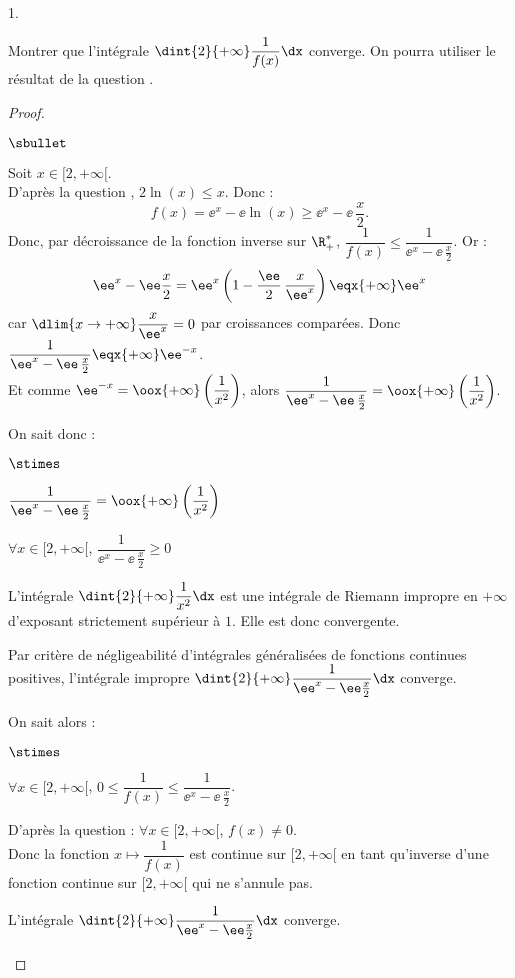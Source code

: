 \begin{noliste}{1.}
\newpage

\item Montrer que l'intégrale $\dint{2}{+\infty} \dfrac{1}{f(x)}\dx$
  converge.  On pourra utiliser le résultat de la question
  .

\begin{proof}~
\begin{noliste}{$\sbullet$}
\item Soit $x\in[2,+\infty[$.\\
D'après la question , $2\ln(x)\leq x$. Donc :
\[
f(x)=\ee^x - \ee \ln(x)\geq \ee^x - \ee \, \frac{x}{2}.
\]
Donc, par décroissance de la fonction inverse sur $\R_+^*$, 
$\dfrac{1}{f(x)}\leq \dfrac{1}{\ee^x-\ee \, \frac{x}{2}}$.
Or :
\[
\ee^x - \ee\frac{x}{2} = \ee^x \left(1 - 
\frac{\ee}{2} \, \frac{x}{\ee^x}\right) \eqx{+\infty} \ee^x
\]
car $\dlim{x\to +\infty} \dfrac{x}{\ee^x}=0$ par croissances comparées. 
Donc
$\dfrac{1}{\ee^x-\ee \, \frac{x}{2}} \eqx{+\infty} \ee^{-x}$.\\[.2cm]
Et comme 
$\ee^{-x}= \oox{+\infty}\left(\dfrac{1}{x^2}\right)$, alors
$\dfrac{1}{\ee^x-\ee \, \frac{x}{2}} = \oox{+\infty} 
\left(\dfrac{1}{x^2}\right)$.

\item On sait donc :
\begin{noliste}{$\stimes$}
  \item $\dfrac{1}{\ee^x-\ee \, \frac{x}{2}} = \oox{+\infty} 
  \left(\dfrac{1}{x^2}\right)$
  
  \item $\forall x\in [2,+\infty[$, $\dfrac{1}{\ee^x-\ee \, \frac{x}{2}}
  \geq 0$
  
  \item L'intégrale $\dint{2}{+\infty} \dfrac{1}{x^2}\dx$ est une 
  intégrale de Riemann impropre en $+\infty$ d'exposant strictement 
  supérieur à $1$. Elle est donc convergente.
\end{noliste}
Par critère de négligeabilité d'intégrales généralisées de fonctions
continues positives, l'intégrale impropre $\dint{2}{+\infty}
\dfrac{1}{\ee^x-\ee \frac{x}{2}} \dx$ converge.

\item On sait alors :
\begin{noliste}{$\stimes$}
  \item $\forall x\in [2,+\infty[$, $0\leq \dfrac{1}{f(x)}\leq 
  \dfrac{1}{\ee^x-\ee \, \frac{x}{2}}$.
  \item D'après la question  : $\forall x\in 
  [2,+\infty[$, $f(x)\neq 0$.\\[.2cm]
  Donc la fonction $x\mapsto \dfrac{1}{f(x)}$ est continue sur 
  $[2,+\infty[$ en tant qu'inverse d'une fonction continue
  sur $[2,+\infty[$ qui ne 
  s'annule pas.
  \item L'intégrale $\dint{2}{+\infty} 
  \dfrac{1}{\ee^x-\ee \frac{x}{2}} \dx$ converge.
  \end{noliste}


\end{noliste}
\end{proof}
\end{noliste}
